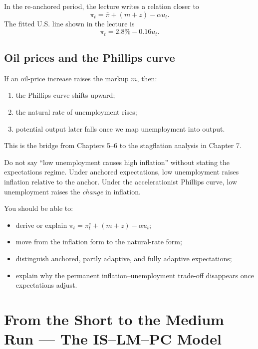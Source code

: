 \documentclass[12pt]{article}
\begin{document}
In the re-anchored period, the lecture writes a relation closer to
\[
\pi_t=\bar{\pi}+(m+z)-\alpha u_t.
\]
The fitted U.S. line shown in the lecture is
\[
\pi_t=2.8\%-0.16u_t.
\]

\subsection{Oil prices and the Phillips curve}

If an oil-price increase raises the markup $m$, then:
\begin{enumerate}[leftmargin=1.5em]
\item the Phillips curve shifts upward;
\item the natural rate of unemployment rises;
\item potential output later falls once we map unemployment into output.
\end{enumerate}
This is the bridge from Chapters 5--6 to the stagflation analysis in Chapter 7.

\begin{commonmistake}
Do not say ``low unemployment causes high inflation'' without stating the expectations regime. Under anchored expectations, low unemployment raises inflation relative to the anchor. Under the accelerationist Phillips curve, low unemployment raises the \emph{change} in inflation.
\end{commonmistake}

\begin{examtip}[title={Exam Focus: High-yield moves}]
You should be able to:
\begin{itemize}[leftmargin=1.5em]
\item derive or explain \(\pi_t=\pi_t^e+(m+z)-\alpha u_t\);
\item move from the inflation form to the natural-rate form;
\item distinguish anchored, partly adaptive, and fully adaptive expectations;
\item explain why the permanent inflation--unemployment trade-off disappears once expectations adjust.
\end{itemize}
\end{examtip}

\newpage
\section{From the Short to the Medium Run --- The IS--LM--PC Model}
\end{document}
